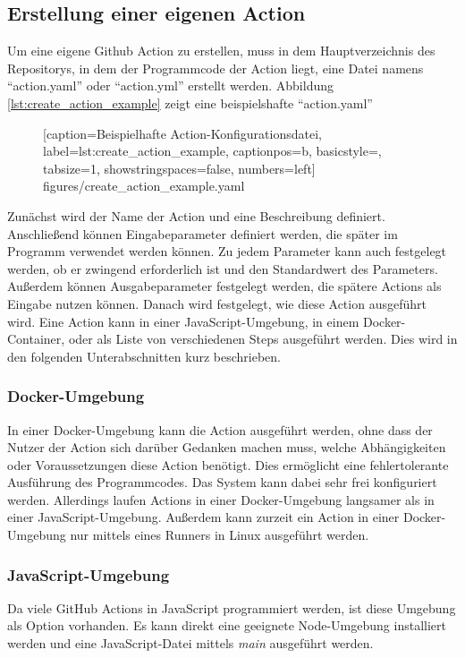\subsection{Erstellung einer eigenen Action}
Um eine eigene Github Action zu erstellen, muss in dem Hauptverzeichnis des Repositorys, in dem der Programmcode der Action liegt, eine Datei namens \enquote{action.yaml} oder \enquote{action.yml} erstellt werden. Abbildung \ref{lst:create_action_example} zeigt eine beispielshafte \enquote{action.yaml}
	\begin{figure}[h!]
			
			[caption={Beispielhafte Action-Konfigurationsdatei},
			label={lst:create_action_example},
			captionpos=b, basicstyle=\footnotesize, tabsize=1, showstringspaces=false,  numbers=left]
			{figures/create_action_example.yaml}
		\end{figure}
Zunächst wird der Name der Action und eine Beschreibung definiert. Anschließend können Eingabeparameter definiert werden, die später im Programm verwendet werden können. Zu jedem Parameter kann auch festgelegt werden, ob er zwingend erforderlich ist und den Standardwert des Parameters. Außerdem können Ausgabeparameter festgelegt werden, die spätere Actions als Eingabe nutzen können. Danach wird festgelegt, wie diese Action ausgeführt wird. Eine Action kann in einer JavaScript-Umgebung, in einem Docker-Container, oder als Liste von verschiedenen Steps ausgeführt werden. Dies wird in den folgenden Unterabschnitten kurz beschrieben.
\subsubsection{Docker-Umgebung}
In einer Docker-Umgebung kann die Action ausgeführt werden, ohne dass der Nutzer der Action sich darüber Gedanken machen muss, welche Abhängigkeiten oder Voraussetzungen diese Action benötigt. Dies ermöglicht eine fehlertolerante Ausführung des Programmcodes. Das System kann dabei sehr frei konfiguriert werden. Allerdings laufen Actions in einer Docker-Umgebung langsamer als in einer JavaScript-Umgebung. Außerdem kann zurzeit ein Action in einer Docker-Umgebung nur mittels eines Runners in Linux ausgeführt werden.

\subsubsection{JavaScript-Umgebung}
Da viele GitHub Actions in JavaScript programmiert werden, ist diese Umgebung als Option vorhanden. Es kann direkt eine geeignete Node-Umgebung installiert werden und eine JavaScript-Datei mittels \textit{main} ausgeführt werden. 

